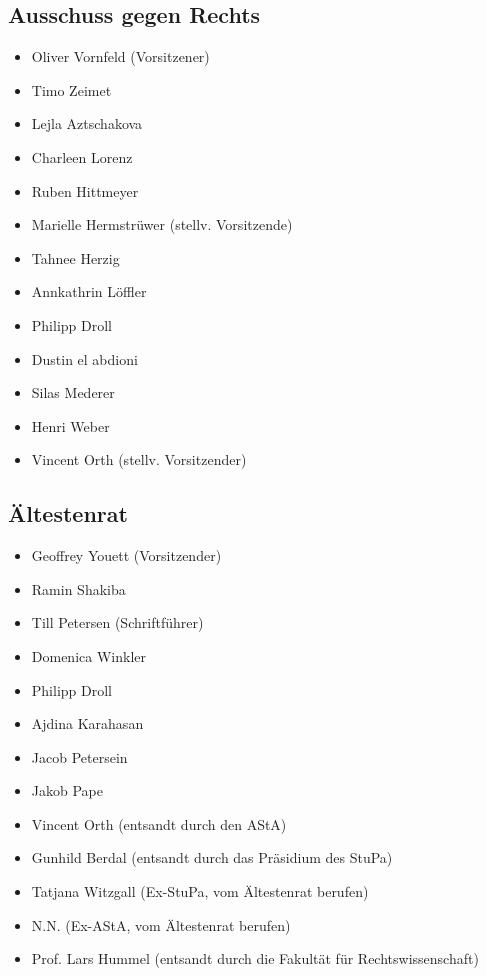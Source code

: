 \documentclass[ngerman,headheight=70pt]{scrartcl}
\begin{document}
\begin{multicols}{2}
    \subsection*{Ausschuss gegen Rechts}
    \begin{itemize}
        \item Oliver Vornfeld (Vorsitzener)
        \item Timo Zeimet
        \item Lejla Aztschakova
        \item Charleen Lorenz
        \item Ruben Hittmeyer
        \item Marielle Hermstrüwer (stellv. Vorsitzende)
        \item Tahnee Herzig
        \item Annkathrin Löffler
        \item Philipp Droll
        \item Dustin el abdioni
        \item Silas Mederer
        \item Henri Weber
        \item Vincent Orth (stellv. Vorsitzender)
    \end{itemize}

    \subsection*{Ältestenrat}
    \begin{itemize}
        \item Geoffrey Youett (Vorsitzender)
        \item Ramin Shakiba
        \item Till Petersen (Schriftführer)
        \item Domenica Winkler
        \item Philipp Droll
        \item Ajdina Karahasan
        \item Jacob Petersein
        \item Jakob Pape
        \item Vincent Orth (entsandt durch den AStA)
        \item Gunhild Berdal (entsandt durch das Präsidium des StuPa)
        \item Tatjana Witzgall (Ex-StuPa, vom Ältestenrat berufen)
        \item N.N. (Ex-AStA, vom Ältestenrat berufen)
        \item Prof. Lars Hummel (entsandt durch die Fakultät für Rechtswissenschaft)
    \end{itemize}
\end{multicols}
\end{document}
